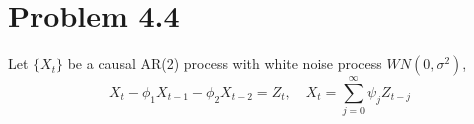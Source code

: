 \documentclass[11pt, oneside]{article}   	%
\begin{document}
\section{Problem 4.4}
Let $\{X_{t}\}$ be a causal AR(2) process with white noise process $WN(0,\sigma^{2})$,
\begin{equation}
X_{t}-\phi_{1}X_{t-1}-\phi_{2}X_{t-2} = Z_{t}, \quad X_{t} = \sum_{j=0}^{\infty}\psi_{j}Z_{t-j}
\end{equation}
% 
\end{document}
